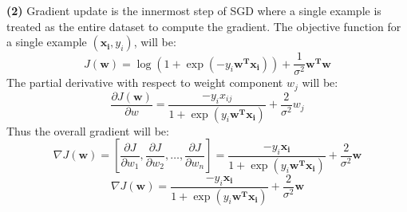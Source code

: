\documentclass{article}
\renewcommand\part[1]{\vspace{.10in}\textbf{(#1)}}
\begin{document}
	\part{2} Gradient update is the innermost step of SGD where a single example is treated as the entire dataset to compute the gradient. The objective function for a single example $(\mathbf{x_i},y_i)$, will be:
	\[ J(\mathbf{w}) = \log(1 + \exp(-y_i\mathbf{w^Tx_i})) + \dfrac{1}{\sigma^2}\mathbf{w^Tw} \]
	The partial derivative with respect to weight component $w_j$ will be:
	\[ \dfrac{\partial J(\mathbf{w})}{\partial w} = \dfrac{-y_ix_{ij}}{1 + \exp(y_i\mathbf{w^Tx_i})} + \dfrac{2}{\sigma^2}w_j \]
	Thus the overall gradient will be:
	\[\nabla J(\mathbf{w}) = [\dfrac{\partial J}{\partial w_1},\dfrac{\partial J}{\partial w_2}, \dots, \dfrac{\partial J}{\partial w_n}] = \dfrac{-y_i\mathbf{x_i}}{1 + \exp(y_i\mathbf{w^Tx_i})} + \dfrac{2}{\sigma^2}\mathbf{w}  \]
	\begin{equation}
	\nabla J(\mathbf{w}) = \dfrac{-y_i\mathbf{x_i}}{1 + \exp(y_i\mathbf{w^Tx_i})} + \dfrac{2}{\sigma^2}\mathbf{w} 
		\label{eq:grad}
	\end{equation}
\end{document}
